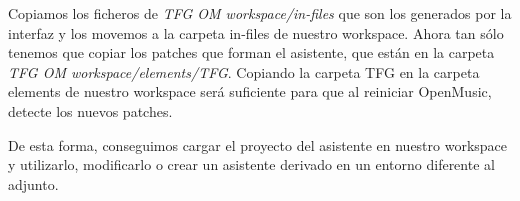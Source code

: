 \documentclass[a4paper,openany,12pt]{memoir}
\begin{document}
Copiamos los ficheros de \emph{TFG OM workspace/in-files} que son los generados por la interfaz y los movemos a la carpeta in-files de nuestro workspace. Ahora tan sólo tenemos que copiar los patches que forman el asistente, que están en la carpeta \emph{TFG OM workspace/elements/TFG}. Copiando la carpeta TFG en la carpeta elements de nuestro workspace será suficiente para que al reiniciar OpenMusic, detecte los nuevos patches.

De esta forma, conseguimos cargar el proyecto del asistente en nuestro workspace y utilizarlo, modificarlo o crear un asistente derivado en un entorno diferente al adjunto.
\end{document}
